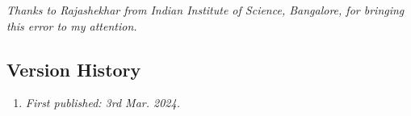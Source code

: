 \emph{Thanks to Rajashekhar from Indian Institute of Science, Bangalore, for bringing this error to my attention.}

\subsection{Version History}
\begin{enumerate}
	\item \emph{First published: 3rd Mar. 2024.}
\end{enumerate}

